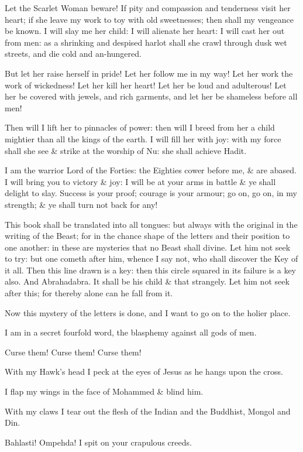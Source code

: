 Let the Scarlet Woman beware! If pity and compassion and tenderness visit her heart; if she leave my work to toy with old sweetnesses; then shall my vengeance be known. I will slay me her child: I will alienate her heart: I will cast her out from men: as a shrinking and despised harlot shall she crawl through dusk wet streets, and die cold and an-hungered.

But let her raise herself in pride! Let her follow me in my way! Let her work the work of wickedness! Let her kill her heart! Let her be loud and adulterous! Let her be covered with jewels, and rich garments, and let her be shameless before all men!

Then will I lift her to pinnacles of power: then will I breed from her a child mightier than all the kings of the earth. I will fill her with joy: with my force shall she see \& strike at the worship of Nu: she shall achieve Hadit.

I am the warrior Lord of the Forties: the Eighties cower before me, \& are abased. I will bring you to victory \& joy: I will be at your arms in battle \& ye shall delight to slay. Success is your proof; courage is your armour; go on, go on, in my strength; \& ye shall turn not back for any!

This book shall be translated into all tongues: but always with the original in the writing of the Beast; for in the chance shape of the letters and their position to one another: in these are mysteries that no Beast shall divine. Let him not seek to try: but one cometh after him, whence I say not, who shall discover the Key of it all. Then this line drawn is a key: then this circle squared in its failure is a key also. And Abrahadabra. It shall be his child \& that strangely. Let him not seek after this; for thereby alone can he fall from it.

Now this mystery of the letters is done, and I want to go on to the holier place.

I am in a secret fourfold word, the blasphemy against all gods of men.

Curse them! Curse them! Curse them!

With my Hawk's head I peck at the eyes of Jesus as he hangs upon the cross.

I flap my wings in the face of Mohammed \& blind him.

With my claws I tear out the flesh of the Indian and the Buddhist, Mongol and Din.

Bahlasti! Ompehda! I spit on your crapulous creeds.

